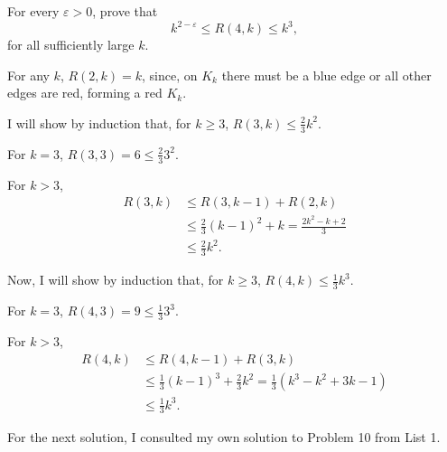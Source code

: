 \documentclass[10pt, a4paper]{article}
\begin{document}
\newpage
\begin{prob}\label{prob:3}
	For every $\varepsilon > 0$, prove that \[
		k^{2-\varepsilon} \leqslant R(4, k) \leqslant k^3,
	\]
	for all sufficiently large $k$.
\end{prob}
\begin{sol}
	For any $k$, $R(2, k) = k$, since, on $K_k$ there must be a blue edge or all other edges are red, forming a red $K_k$.

	I will show by induction that, for $k \geqslant 3$, $R(3, k) \leqslant \frac{2}{3}k^2$. 
	\begin{dem}
		For $k = 3$, $R(3, 3) = 6 \leqslant \frac{2}{3} 3^2$.

		For $k > 3$,
		\begin{align*}
			R(3, k) &\leqslant R(3, k-1) + R(2, k)\\
					&\leqslant \frac{2}{3}(k-1)^2 + k = \frac{2k^2 - k + 2}{3}\\
					&\leqslant \frac{2}{3}k^2.
		\end{align*}
	\end{dem}

	Now, I will show by induction that, for $k \geqslant 3$, $R(4, k) \leqslant \frac{1}{3}k^3$. 
	\begin{dem}
		For $k = 3$,  $R(4, 3) = 9 \leqslant \frac{1}{3} 3^3$.

		For $k > 3$,
		\begin{align*}
			R(4, k) &\leqslant R(4, k-1) + R(3, k)\\
					&\leqslant \frac{1}{3}(k-1)^3 + \frac{2}{3}k^2 = \frac{1}{3}(k^3 - k^2 + 3k - 1)\\
					&\leqslant \frac{1}{3}k^3.
		\end{align*}
	\end{dem}
	
\end{sol}

\begin{rem}
	For the next solution, I consulted my own solution to Problem 10 from List 1.
\end{rem}
\end{document}
